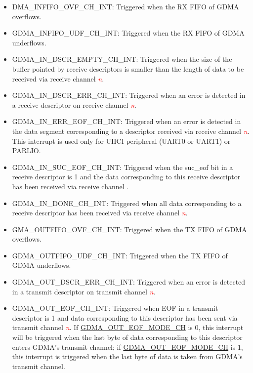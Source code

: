 \documentclass[main\_\_EN.tex]{subfiles}
\begin{document}
\begin{itemize}
\item \label{int:GDMAINFIFOOVFINT}DMA\_INFIFO\_OVF\_CH\_INT: Triggered when the RX FIFO of GDMA overflows.
\item \label{int:GDMAINFIFOUDFINT}GDMA\_INFIFO\_UDF\_CH\_INT: Triggered when the  RX FIFO of GDMA underflows.
\item \label{int:GDMAINDSCREMPTYINT}GDMA\_IN\_DSCR\_EMPTY\_CH\_INT: Triggered when the size of the buffer pointed by receive descriptors is smaller than the length of data to be received via receive channel \textcolor{red}{\it{n}}.
\item \label{int:GDMAINDSCRERRINT}GDMA\_IN\_DSCR\_ERR\_CH\_INT: Triggered when an error is detected in a receive descriptor on receive channel \textcolor{red}{\it{n}}.
\item \label{int:GDMAINERREOFINT}GDMA\_IN\_ERR\_EOF\_CH\_INT: Triggered when an error is detected in the data segment corresponding to a descriptor received via receive channel \textcolor{red}{\it{n}}. This interrupt is used only for UHCI peripheral (UART0 or UART1) or PARLIO.
\item \label{int:GDMAINSUCEOFINT}GDMA\_IN\_SUC\_EOF\_CH\_INT: Triggered when the suc\_eof bit in a receive descriptor is 1 and the data corresponding to this receive descriptor has been received via receive channel .
\item \label{int:GDMAINDONEINT}GDMA\_IN\_DONE\_CH\_INT: Triggered when all data corresponding to a receive descriptor has been received via receive channel \textcolor{red}{\it{n}}.
\item \label{int:GDMAOUTFIFOOVFINT}GMA\_OUTFIFO\_OVF\_CH\_INT: Triggered when the TX FIFO of GDMA overflows.
\item \label{int:GDMAOUTFIFOUDFINT}GDMA\_OUTFIFO\_UDF\_CH\_INT: Triggered when the TX FIFO of GDMA underflows.
\item \label{int:GDMAOUTDSCRERRINT}GDMA\_OUT\_DSCR\_ERR\_CH\_INT: Triggered when an error is detected in a transmit descriptor on transmit channel \textcolor{red}{\it{n}}.
\item \label{int:GDMAOUTEOFINT}GDMA\_OUT\_EOF\_CH\_INT: Triggered when EOF in a transmit descriptor is 1 and data corresponding to this descriptor has been sent via transmit channel \textcolor{red}{\it{n}}. If \hyperref[fielddesc:GDMAOUTEOFMODECHN]{GDMA\_OUT\_EOF\_MODE\_CH} is 0, this interrupt will be triggered when the last byte of data corresponding to this descriptor enters GDMA's transmit channel; if \hyperref[fielddesc:GDMAOUTEOFMODECHN]{GDMA\_OUT\_EOF\_MODE\_CH} is 1, this interrupt is triggered when the last byte of data is taken from GDMA's transmit channel.

\end{itemize}
\end{document}
